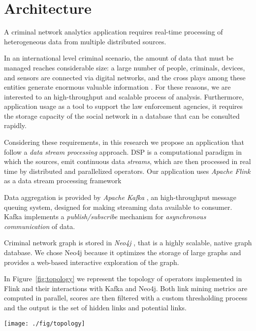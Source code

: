 \section{Architecture}
\label{sec:architecture}

A criminal network analytics application requires real-time processing of heterogeneous data from multiple distributed sources.

In an international level criminal scenario, the amount of data that must be managed reaches considerable size: a large number of people, criminals, devices, and sensors are connected via digital networks, and the cross plays among these entities generate enormous valuable information \cite{FrameworkBigdata}. For these reasons, we are interested to an high-throughput and scalable process of analysis.
Furthermore, application usage as a tool to support the law enforcement agencies, it requires the storage capacity of the social network in a database that can be consulted rapidly.

Considering these requirements, in this research we propose an application that follow a \textit{data stream processing} approach. DSP is a computational paradigm in which the sources, emit continuous data \textit{streams}, which are then processed in real time by distributed and parallelized operators. Our application uses \textit{Apache Flink} \cite{flink} as a data stream processing framework 

Data aggregation is provided by \textit{Apache Kafka} \cite{kafka}, an high-throughput message queuing system, designed for making streaming data available to consumer. Kafka implements a \textit{publish/subscribe} mechanism for \textit{asynchronous communication} of data.

Criminal network graph is stored in \textit{Neo4j} \cite{neo4j}, that is a highly scalable, native graph database. We chose Neo4j because it optimizes the storage of large graphs and provides a web-based interactive exploration of the graph.

In Figure~\ref{fig:topology} we represent the topology of operators implemented in Flink and their interactions with Kafka and Neo4j. Both link mining metrics are computed in parallel, scores are then filtered with a custom thresholding process and the output is the set of hidden links and potential links.
 

\begin{figure*}
\centering
\texttt{[image: ./fig/topology]}
\caption{The topology of architecture.}
\label{fig:topology}
\end{figure*}

